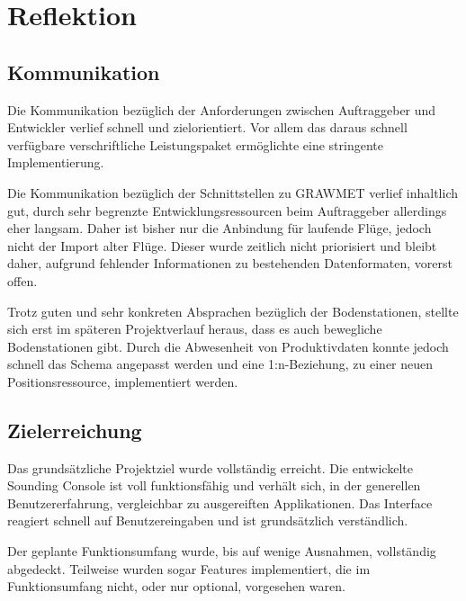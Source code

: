 \section{Reflektion}

\subsection{Kommunikation}
Die Kommunikation bezüglich der Anforderungen zwischen Auftraggeber und Entwickler verlief schnell und zielorientiert.
Vor allem das daraus schnell verfügbare verschriftliche Leistungspaket ermöglichte eine stringente Implementierung.

Die Kommunikation bezüglich der Schnittstellen zu GRAWMET verlief inhaltlich gut, durch sehr begrenzte Entwicklungsressourcen beim Auftraggeber allerdings eher langsam.
Daher ist bisher nur die Anbindung für laufende Flüge, jedoch nicht der Import alter Flüge.
Dieser wurde zeitlich nicht priorisiert und bleibt daher, aufgrund fehlender Informationen zu bestehenden Datenformaten, vorerst offen.

Trotz guten und sehr konkreten Absprachen bezüglich der Bodenstationen, stellte sich erst im späteren Projektverlauf heraus, dass es auch bewegliche Bodenstationen gibt.
Durch die Abwesenheit von Produktivdaten konnte jedoch schnell das Schema angepasst werden und eine 1:n-Beziehung, zu einer neuen Positionsressource, implementiert werden.

\subsection{Zielerreichung}
Das grundsätzliche Projektziel wurde vollständig erreicht.
Die entwickelte Sounding Console ist voll funktionsfähig und verhält sich, in der generellen Benutzererfahrung, vergleichbar zu ausgereiften Applikationen.
Das Interface reagiert schnell auf Benutzereingaben und ist grundsätzlich verständlich.

Der geplante Funktionsumfang wurde, bis auf wenige Ausnahmen, vollständig abgedeckt.
Teilweise wurden sogar Features implementiert, die im Funktionsumfang nicht, oder nur optional, vorgesehen waren.
